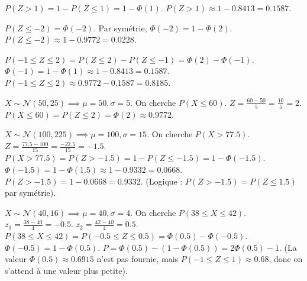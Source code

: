 \begin{correctionbox}
$P(Z > 1) = 1 - P(Z \le 1) = 1 - \Phi(1)$.
$P(Z > 1) \approx 1 - 0.8413 = 0.1587$.
\end{correctionbox}

\begin{correctionbox}
$P(Z \le -2) = \Phi(-2)$. Par symétrie, $\Phi(-2) = 1 - \Phi(2)$.
$P(Z \le -2) \approx 1 - 0.9772 = 0.0228$.
\end{correctionbox}

\begin{correctionbox}
$P(-1 \le Z \le 2) = P(Z \le 2) - P(Z \le -1) = \Phi(2) - \Phi(-1)$.
$\Phi(-1) = 1 - \Phi(1) \approx 1 - 0.8413 = 0.1587$.
$P(-1 \le Z \le 2) \approx 0.9772 - 0.1587 = 0.8185$.
\end{correctionbox}

\begin{correctionbox}
$X \sim \mathcal{N}(50, 25) \implies \mu=50, \sigma=5$.
On cherche $P(X \le 60)$.
$Z = \frac{60 - 50}{5} = \frac{10}{5} = 2$.
$P(X \le 60) = P(Z \le 2) = \Phi(2) \approx 0.9772$.
\end{correctionbox}

\begin{correctionbox}
$X \sim \mathcal{N}(100, 225) \implies \mu=100, \sigma=15$.
On cherche $P(X > 77.5)$.
$Z = \frac{77.5 - 100}{15} = \frac{-22.5}{15} = -1.5$.
$P(X > 77.5) = P(Z > -1.5) = 1 - P(Z \le -1.5) = 1 - \Phi(-1.5)$.
$\Phi(-1.5) = 1 - \Phi(1.5) \approx 1 - 0.9332 = 0.0668$.
$P(Z > -1.5) = 1 - 0.0668 = 0.9332$. (Logique : $P(Z > -1.5) = P(Z \le 1.5)$ par symétrie).
\end{correctionbox}

\begin{correctionbox}
$X \sim \mathcal{N}(40, 16) \implies \mu=40, \sigma=4$.
On cherche $P(38 \le X \le 42)$.
$z_1 = \frac{38 - 40}{4} = -0.5$. $z_2 = \frac{42 - 40}{4} = 0.5$.
$P(38 \le X \le 42) = P(-0.5 \le Z \le 0.5) = \Phi(0.5) - \Phi(-0.5)$.
$\Phi(-0.5) = 1 - \Phi(0.5)$.
$P = \Phi(0.5) - (1 - \Phi(0.5)) = 2\Phi(0.5) - 1$.
(La valeur $\Phi(0.5) \approx 0.6915$ n'est pas fournie, mais $P(-1 \le Z \le 1) \approx 0.68$, donc on s'attend à une valeur plus petite).
\end{correctionbox}

